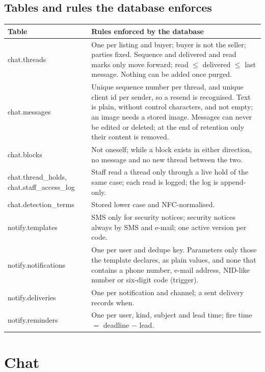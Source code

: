 \documentclass[11pt,a4paper]{article}
\newenvironment{dtable}[1]{\small\begin{longtable}{#1}}{\end{longtable}}
\begin{document}
\subsection{Tables and rules the database enforces}
\begin{dtable}{@{}>{\ttfamily\raggedright\arraybackslash}p{3.7cm}>{\raggedright\arraybackslash}p{11.5cm}@{}}
\toprule
\textnormal{\textbf{Table}} & \textbf{Rules enforced by the database} \\ \midrule \endhead
chat.threads & One per listing and buyer; buyer is not the seller; parties fixed. Sequence and delivered and read marks only move forward; read $\le$ delivered $\le$ last message. Nothing can be added once purged. \\
chat.messages & Unique sequence number per thread, and unique client id per sender, so a resend is recognised. Text is plain, without control characters, and not empty; an image needs a stored image. Messages can never be edited or deleted; at the end of retention only their content is removed. \\
chat.blocks & Not oneself; while a block exists in either direction, no message and no new thread between the two. \\
chat.thread\_holds, chat.\allowbreak staff\_access\_log & Staff read a thread only through a live hold of the same case; each read is logged; the log is append-only. \\
chat.detection\_terms & Stored lower case and NFC-normalised. \\
notify.templates & SMS only for security notices; security notices always by SMS and e-mail; one active version per code. \\
notify.notifications & One per user and dedupe key. Parameters only those the template declares, as plain values, and none that contains a phone number, e-mail address, NID-like number or six-digit code (trigger). \\
notify.deliveries & One per notification and channel; a sent delivery records when. \\
notify.reminders & One per user, kind, subject and lead time; fire time $=$ deadline $-$ lead. \\
\bottomrule
\end{dtable}

\section{Chat}
\label{sec:chat}
\end{document}
